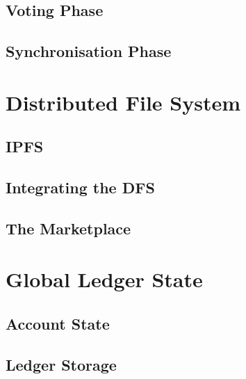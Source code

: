 \documentclass{article}
\begin{document}



\subsection{Voting Phase}



\subsection{Synchronisation Phase}




\section{Distributed File System}



\subsection{IPFS}



\subsection{Integrating the DFS}



\subsection{The Marketplace}


\newpage
\section{Global Ledger State}


\subsection{Account State}


\subsection{Ledger Storage}

\end{document}
